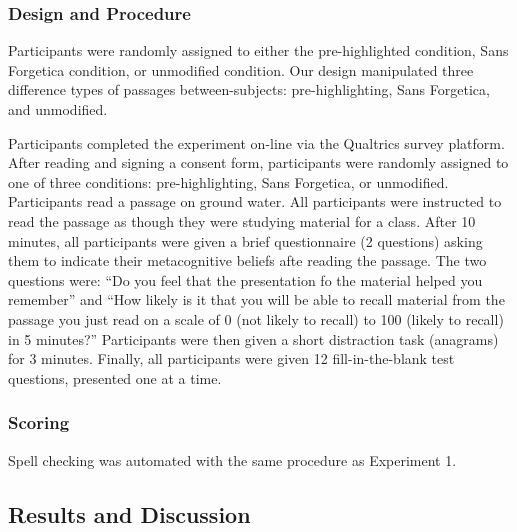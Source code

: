 \documentclass[english,doc]{apa6}
\begin{document}
\hypertarget{design-and-procedure-1}{%
\subsubsection{Design and Procedure}\label{design-and-procedure-1}}

Participants were randomly assigned to either the pre-highlighted condition, Sans Forgetica condition, or unmodified condition. Our design manipulated three difference types of passages between-subjects: pre-highlighting, Sans Forgetica, and unmodified.

Participants completed the experiment on-line via the Qualtrics survey platform. After reading and signing a consent form, participants were randomly assigned to one of three conditions: pre-highlighting, Sans Forgetica, or unmodified. Participants read a passage on ground water. All participants were instructed to read the passage as though they were studying material for a class. After 10 minutes, all participants were given a brief questionnaire (2 questions) asking them to indicate their metacognitive beliefs afte reading the passage. The two questions were: \enquote{Do you feel that the presentation fo the material helped you remember} and \enquote{How likely is it that you will be able to recall material from the passage you just read on a scale of 0 (not likely to recall) to 100 (likely to recall) in 5 minutes?} Participants were then given a short distraction task (anagrams) for 3 minutes. Finally, all participants were given 12 fill-in-the-blank test questions, presented one at a time.

\hypertarget{scoring-1}{%
\subsubsection{Scoring}\label{scoring-1}}

Spell checking was automated with the same procedure as Experiment 1.

\hypertarget{results-and-discussion-1}{%
\subsection{Results and Discussion}\label{results-and-discussion-1}}
\end{document}
